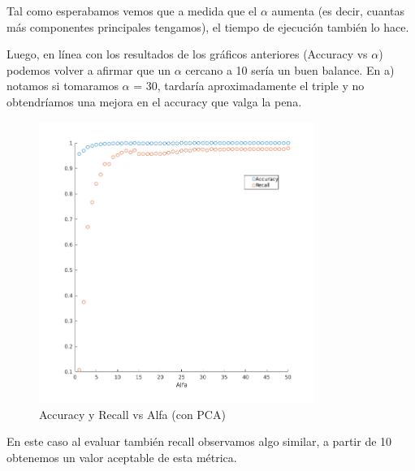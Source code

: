 Tal como esperabamos vemos que a medida que el $\alpha$ aumenta (es decir, cuantas más componentes principales tengamos), el tiempo de ejecución también lo hace.

Luego, en línea con los resultados de los gráficos anteriores (Accuracy vs $\alpha$) podemos volver a afirmar que un $\alpha$ cercano a 10 sería un buen balance. En a) notamos si tomaramos $\alpha$ = 30, tardaría aproximadamente el triple y no obtendríamos una mejora en el accuracy que valga la pena.
\begin{figure}[H]
	\centering
	\includegraphics[width=0.8\textwidth]{img/Acc_recall_alfa_pca.png}
	\caption{Accuracy y Recall vs Alfa (con PCA)}
	\label{fig: Accuracy y Recall vs Alfa (con PCA)}
\end{figure}

En este caso al evaluar también recall observamos algo similar, a partir de 10 obtenemos un valor aceptable de esta métrica.

